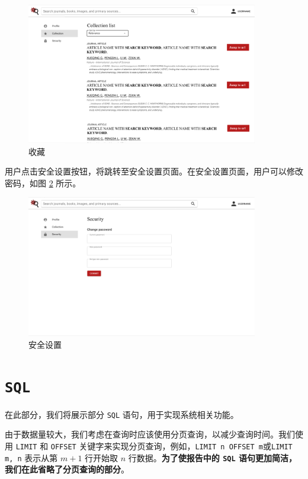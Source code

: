 \documentclass[UTF8,openany]{ctexbook}
\begin{document}
\begin{figure}[H]
\centering
\includegraphics[width=0.9\textwidth]{img/9.png}
\caption{收藏}
\label{fig:collect}
\end{figure}

用户点击安全设置按钮，将跳转至安全设置页面。在安全设置页面，用户可以修改密码，如图 \ref{fig:security} 所示。

\begin{figure}[H]
\centering
\includegraphics[width=0.9\textwidth]{img/10.png}
\caption{安全设置}
\label{fig:security}
\end{figure}

\chapter{\texttt{SQL}}
\label{sec:sql}

在此部分，我们将展示部分 \texttt{SQL} 语句，用于实现系统相关功能。

由于数据量较大，我们考虑在查询时应该使用分页查询，以减少查询时间。我们使用 \texttt{LIMIT} 和 \texttt{OFFSET} 关键字来实现分页查询，例如，\texttt{LIMIT n OFFSET m}或\texttt{LIMIT m, n} 表示从第 $m+1$ 行开始取 $n$ 行数据。\textbf{为了使报告中的 \texttt{SQL} 语句更加简洁，我们在此省略了分页查询的部分}。
\end{document}
